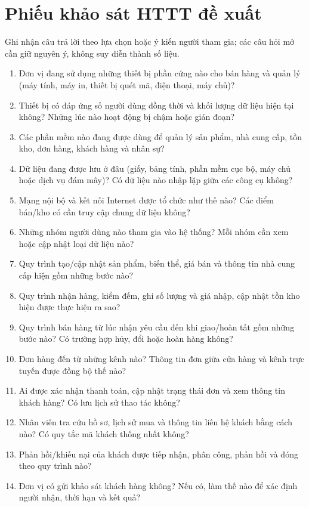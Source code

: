 \section{Phiếu khảo sát HTTT đề xuất}
Ghi nhận câu trả lời theo lựa chọn hoặc ý kiến người tham gia; các câu hỏi mở cần giữ nguyên ý, không suy diễn thành số liệu.
\begin{enumerate}
\item Đơn vị đang sử dụng những thiết bị phần cứng nào cho bán hàng và quản lý (máy tính, máy in, thiết bị quét mã, điện thoại, máy chủ)?
\item Thiết bị có đáp ứng số người dùng đồng thời và khối lượng dữ liệu hiện tại không? Những lúc nào hoạt động bị chậm hoặc gián đoạn?
\item Các phần mềm nào đang được dùng để quản lý sản phẩm, nhà cung cấp, tồn kho, đơn hàng, khách hàng và nhân sự?
\item Dữ liệu đang được lưu ở đâu (giấy, bảng tính, phần mềm cục bộ, máy chủ hoặc dịch vụ đám mây)? Có dữ liệu nào nhập lặp giữa các công cụ không?
\item Mạng nội bộ và kết nối Internet được tổ chức như thế nào? Các điểm bán/kho có cần truy cập chung dữ liệu không?
\item Những nhóm người dùng nào tham gia vào hệ thống? Mỗi nhóm cần xem hoặc cập nhật loại dữ liệu nào?
\item Quy trình tạo/cập nhật sản phẩm, biến thể, giá bán và thông tin nhà cung cấp hiện gồm những bước nào?
\item Quy trình nhận hàng, kiểm đếm, ghi số lượng và giá nhập, cập nhật tồn kho hiện được thực hiện ra sao?
\item Quy trình bán hàng từ lúc nhận yêu cầu đến khi giao/hoàn tất gồm những bước nào? Có trường hợp hủy, đổi hoặc hoàn hàng không?
\item Đơn hàng đến từ những kênh nào? Thông tin đơn giữa cửa hàng và kênh trực tuyến được đồng bộ thế nào?
\item Ai được xác nhận thanh toán, cập nhật trạng thái đơn và xem thông tin khách hàng? Có lưu lịch sử thao tác không?
\item Nhân viên tra cứu hồ sơ, lịch sử mua và thông tin liên hệ khách bằng cách nào? Có quy tắc mã khách thống nhất không?
\item Phản hồi/khiếu nại của khách được tiếp nhận, phân công, phản hồi và đóng theo quy trình nào?
\item Đơn vị có gửi khảo sát khách hàng không? Nếu có, làm thế nào để xác định người nhận, thời hạn và kết quả?

\end{enumerate}
